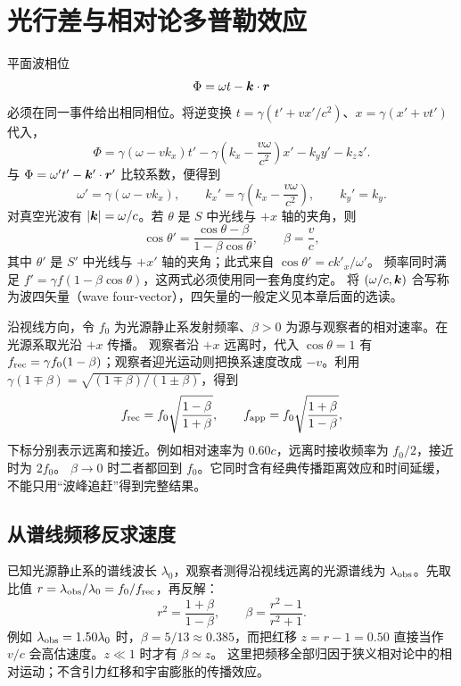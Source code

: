 \section{光行差与相对论多普勒效应}

平面波相位
\begin{equation}
 \Phi=\omega t-\bm{k}\cdot\bm{r}
\end{equation}
必须在同一事件给出相同相位。将逆变换 $t=\gamma(t'+vx'/c^2)$、$x=\gamma(x'+vt')$ 代入，
\[
 \Phi=\gamma(\omega-vk_x)t'
 -\gamma\left(k_x-\frac{v\omega}{c^2}\right)x'-k_yy'-k_zz'.
\]
与 $\Phi=\omega't'-\bm{k}'\cdot\bm{r}'$ 比较系数，便得到
\begin{equation}
 \omega'=\gamma(\omega-vk_x),\qquad
 k_x'=\gamma\left(k_x-\frac{v\omega}{c^2}\right),\qquad
 k_y'=k_y.
\end{equation}
对真空光波有 $|\bm{k}|=\omega/c$。若 $\theta$ 是 $S$ 中光线与 $+x$ 轴的夹角，则
\begin{equation}
 \cos\theta'=\frac{\cos\theta-\beta}{1-\beta\cos\theta},\qquad
 \beta=\frac vc,
\end{equation}
其中 $\theta'$ 是 $S'$ 中光线与 $+x'$ 轴的夹角；此式来自 $\cos\theta'=ck'_x/\omega'$。
频率同时满足 $f'=\gamma f(1-\beta\cos\theta)$，这两式必须使用同一套角度约定。
将 $(\omega/c,\bm{k})$ 合写称为波四矢量（wave four-vector），四矢量的一般定义见本章后面的选读。

沿视线方向，令 $f_0$ 为光源静止系发射频率、$\beta>0$ 为源与观察者的相对速率。在光源系取光沿 $+x$ 传播。
观察者沿 $+x$ 远离时，代入 $\cos\theta=1$ 有
$f_{\rm rec}=\gamma f_0(1-\beta)$；观察者迎光运动则把换系速度改成 $-v$。利用
$\gamma(1\mp\beta)=\sqrt{(1\mp\beta)/(1\pm\beta)}$，得到
\begin{equation}
 f_{\rm rec}=f_0\sqrt{\frac{1-\beta}{1+\beta}},
 \qquad
 f_{\rm app}=f_0\sqrt{\frac{1+\beta}{1-\beta}},
\end{equation}
下标分别表示远离和接近。例如相对速率为 $0.60c$，远离时接收频率为 $f_0/2$，接近时为 $2f_0$。
$\beta\to0$ 时二者都回到 $f_0$。它同时含有经典传播距离效应和时间延缓，不能只用“波峰追赶”得到完整结果。




\subsection{从谱线频移反求速度}
已知光源静止系的谱线波长 $\lambda_0$，观察者测得沿视线远离的光源谱线为 $\lambda_{\rm obs}$。先取比值 $r=\lambda_{\rm obs}/\lambda_0=f_0/f_{\rm rec}$，再反解：
\[
 r^2=\frac{1+\beta}{1-\beta},\qquad
 \beta=\frac{r^2-1}{r^2+1}.
\]
例如 $\lambda_{\rm obs}=1.50\lambda_0$ 时，$\beta=5/13\approx0.385$，而把红移 $z=r-1=0.50$ 直接当作 $v/c$ 会高估速度。$z\ll1$ 时才有 $\beta\simeq z$。
这里把频移全部归因于狭义相对论中的相对运动；不含引力红移和宇宙膨胀的传播效应。


